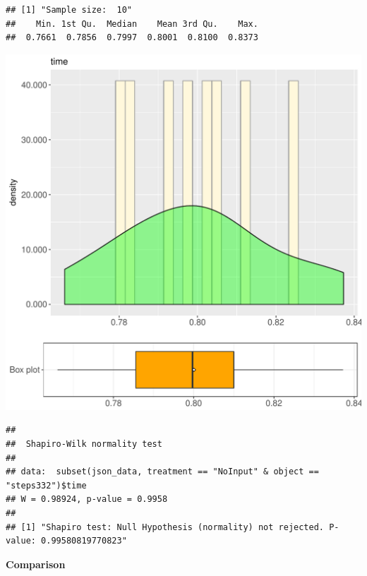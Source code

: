 \documentclass{article}\usepackage[]{graphicx}\usepackage[]{color}
\makeatletter
\def\maxwidth{ %
  \ifdim\Gin@nat@width>\linewidth
    \linewidth
  \else
    \Gin@nat@width
  \fi
}
\newenvironment{kframe}{%
 \def\at@end@of@kframe{}%
 \ifinner\ifhmode%
  \def\at@end@of@kframe{\end{minipage}}%
  \begin{minipage}{\columnwidth}%
 \fi\fi%
 \def\FrameCommand##1{\hskip\@totalleftmargin \hskip-\fboxsep
 \colorbox{shadecolor}{##1}\hskip-\fboxsep
     \hskip-\linewidth \hskip-\@totalleftmargin \hskip\columnwidth}%
 \MakeFramed {\advance\hsize-\width
   \@totalleftmargin\z@ \linewidth\hsize
   \@setminipage}}%
 {\par\unskip\endMakeFramed%
 \at@end@of@kframe}
\newenvironment{knitrout}{}{} %
\makeatother
\begin{document}
\begin{knitrout}
\color{fgcolor}\begin{kframe}
\begin{verbatim}
## [1] "Sample size:  10"
##    Min. 1st Qu.  Median    Mean 3rd Qu.    Max. 
##  0.7661  0.7856  0.7997  0.8001  0.8100  0.8373
\end{verbatim}
\end{kframe}
\includegraphics[width=\maxwidth]{figure/RH4_NoInput_steps332-1} 
\begin{kframe}\begin{verbatim}
## 
## 	Shapiro-Wilk normality test
## 
## data:  subset(json_data, treatment == "NoInput" & object == "steps332")$time
## W = 0.98924, p-value = 0.9958
## 
## [1] "Shapiro test: Null Hypothesis (normality) not rejected. P-value: 0.99580819770823"
\end{verbatim}
\end{kframe}
\end{knitrout}
  
 \textbf{Comparison}
  
\end{document}
